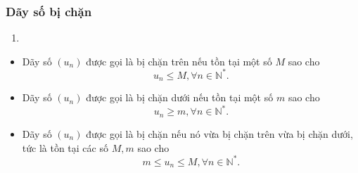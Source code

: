 \subsubsection{Dãy số bị chặn}

\begin{dn}
	\begin{enumerate}
		\item[]
	\end{enumerate}
	\begin{itemize}
		\item Dãy số $(u_n)$ được gọi là bị chặn trên nếu tồn tại một số $M$ sao cho $$u_n\leq M, \forall n\in \mathbb{N}^*.$$
		\item Dãy số $(u_n)$ được gọi là bị chặn dưới nếu tồn tại một số $m$ sao cho $$u_n\geq m, \forall n\in \mathbb{N}^*.$$
		\item Dãy số $(u_n)$ được gọi là bị chặn nếu nó vừa bị chặn trên vừa bị chặn dưới, tức là tồn tại các số $M, m$ sao cho $$m\leq u_n\leq M, \forall n\in \mathbb{N}^*.$$
	\end{itemize}
\end{dn}
